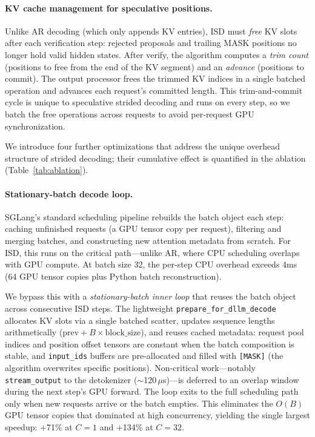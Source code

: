 \paragraph{KV cache management for speculative positions.}
Unlike AR decoding (which only appends KV entries), ISD must \emph{free} KV slots after each verification step: rejected proposals and trailing MASK positions no longer hold valid hidden states. After verify, the algorithm computes a \emph{trim count} (positions to free from the end of the KV segment) and an \emph{advance} (positions to commit). The output processor frees the trimmed KV indices in a single batched operation and advances each request's committed length. This trim-and-commit cycle is unique to speculative strided decoding and runs on every step, so we batch the free operations across requests to avoid per-request GPU synchronization.

We introduce four further optimizations that address the unique overhead structure of strided decoding; their cumulative effect is quantified in the ablation (Table~\ref{tab:ablation}).

\paragraph{Stationary-batch decode loop.}
SGLang's standard scheduling pipeline rebuilds the batch object each step: caching unfinished requests (a GPU tensor copy per request), filtering and merging batches, and constructing new attention metadata from scratch. For ISD, this runs on the critical path---unlike AR, where CPU scheduling overlaps with GPU compute. At batch size 32, the per-step CPU overhead exceeds 4ms (64 GPU tensor copies plus Python batch reconstruction).

We bypass this with a \emph{stationary-batch inner loop} that reuses the batch object across consecutive ISD steps. The lightweight \texttt{prepare\_for\_dllm\_decode} allocates KV slots via a single batched scatter, updates sequence lengths arithmetically ($\text{prev} + B \times \text{block\_size}$), and reuses cached metadata: request pool indices and position offset tensors are constant when the batch composition is stable, and \texttt{input\_ids} buffers are pre-allocated and filled with \texttt{[MASK]} (the algorithm overwrites specific positions). Non-critical work---notably \texttt{stream\_output} to the detokenizer (${\sim}$120\,$\mu$s)---is deferred to an overlap window during the next step's GPU forward. The loop exits to the full scheduling path only when new requests arrive or the batch empties. This eliminates the $O(B)$ GPU tensor copies that dominated at high concurrency, yielding the single largest speedup: $+$71\% at $C{=}1$ and $+$134\% at $C{=}32$.

